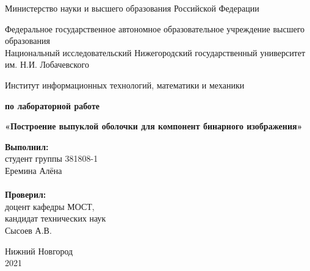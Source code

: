 \documentclass{report}
\begin{document}
\begin{titlepage}

\begin{center}
Министерство науки и высшего образования Российской Федерации
\end{center}

\begin{center}
Федеральное государственное автономное образовательное учреждение высшего образования \\
Национальный исследовательский Нижегородский государственный университет им. Н.И. Лобачевского
\end{center}

\begin{center}
Институт информационных технологий, математики и механики
\end{center}

\vspace{4em}

\begin{center}
\textbf{ по лабораторной работе} \\
\end{center}
\begin{center}
\textbf{\Large«Построение выпуклой оболочки для компонент бинарного изображения»} \\
\end{center}

\vspace{4em}

\newbox{\lbox}
\newlength{\maxl}
\setlength{\maxl}{\wd\lbox}
\hfill\parbox{7cm}{
\hspace*{5cm}\hspace*{-5cm}\textbf{Выполнил:} \\ студент группы 381808-1 \\ Еремина Алёна\\
\\
\hspace*{5cm}\hspace*{-5cm}\textbf{Проверил:}\\ доцент кафедры МОСТ, \\ кандидат технических наук \\ Сысоев А.В.\\
}
\vspace{\fill}

\begin{center} Нижний Новгород \\ 2021 \end{center}

\end{titlepage}
\end{document}
